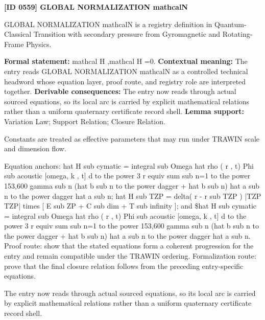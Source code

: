 \clearpage
\noindent\textbf{[ID 0559] GLOBAL NORMALIZATION mathcalN}\par
\vspace{0.35em}
\begingroup\small
{}
GLOBAL NORMALIZATION mathcalN is a registry definition in Quantum-Classical Transition with secondary pressure from Gyromagnetic and Rotating-Frame Physics.

\begingroup\footnotesize\setlength{\emergencystretch}{3em}\sloppy
\textbf{Formal statement:} mathcal H ,mathcal H =0. \textbf{Contextual meaning:} The entry reads GLOBAL NORMALIZATION mathcalN as a controlled technical headword whose equation layer, proof route, and registry role are interpreted together. \textbf{Derivable consequences:} The entry now reads through actual sourced equations, so its local arc is carried by explicit mathematical relations rather than a uniform quaternary certificate record shell. \textbf{Lemma support:} Variation Law; Support Relation; Closure Relation.\par
\endgroup

Constants are treated as effective parameters that may run under TRAWIN scale and dimension flow.

Equation anchors: hat H sub cymatic = integral sub Omega hat rho ( r , t) Phi sub acoustic [omega, k , t] d to the power 3 r equiv sum sub n=1 to the power 153,600 gamma sub n (hat b sub n to the power dagger + hat b sub n) hat a sub n to the power dagger hat a sub n; hat H sub TZP = delta( r - r sub TZP ) |TZP TZP| times [ E sub ZP + C sub dim + T sub infinity ]; and \$hat H sub cymatic = integral sub Omega hat rho ( r , t) Phi sub acoustic [omega, k , t] d to the power 3 r equiv sum sub n=1 to the power 153,600 gamma sub n (hat b sub n to the power dagger + hat b sub n) hat a sub n to the power dagger hat a sub n. Proof route: show that the stated equations form a coherent progression for the entry and remain compatible under the TRAWIN ordering. Formalization route: prove that the final closure relation follows from the preceding entry-specific equations.

The entry now reads through actual sourced equations, so its local arc is carried by explicit mathematical relations rather than a uniform quaternary certificate record shell.
\endgroup

